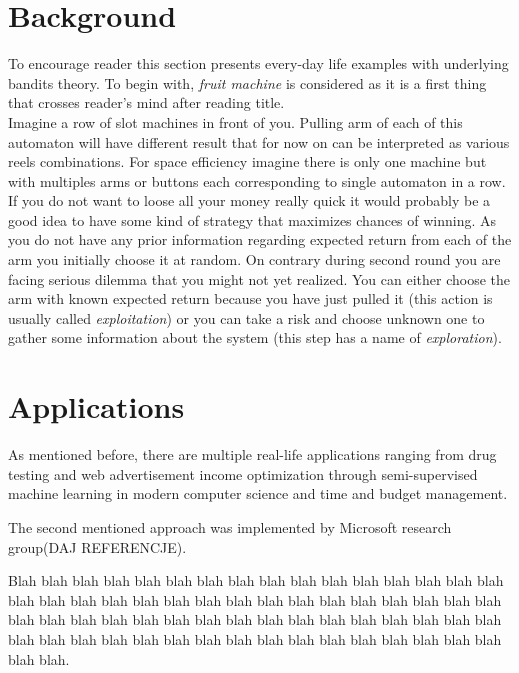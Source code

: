 \documentclass[12pt, a4paper, pdflatex]{report}
\begin{document}
\section{Background}
To encourage reader this section presents every-day life examples with underlying bandits theory. To begin with, \emph{fruit machine} is considered as it is a first thing that crosses reader's mind after reading title.\\
Imagine a row of slot machines in front of you. Pulling arm of each of this automaton will have different result that for now on can be interpreted as various reels combinations. For space efficiency imagine there is only one machine but with multiples arms or buttons each corresponding to single automaton in a row. If you do not want to loose all your money really quick it would probably be a good idea to have some kind of strategy that maximizes chances of winning. As you do not have any prior information regarding expected return from each of the arm you initially choose it at random. On contrary during second round you are facing serious dilemma that you might not yet realized. You can either choose the arm with known expected return because you have just pulled it (this action is  usually called \emph{exploitation}) or you can take a risk and choose unknown one to gather some information about the system (this step has a name of \emph{exploration}).

\section{Applications}
As mentioned before, there are multiple real-life applications ranging from drug testing and web advertisement income optimization through semi-supervised machine learning in modern computer science and time and budget management.

The second mentioned approach was implemented by Microsoft research group(DAJ REFERENCJE).

Blah blah blah blah blah blah blah blah blah blah blah blah blah blah blah blah blah blah blah blah blah blah blah blah blah blah blah blah blah blah blah blah blah blah blah blah blah blah blah blah blah blah blah blah blah blah blah blah blah blah blah blah blah blah blah blah blah blah blah blah blah blah blah blah blah blah.
\end{document}
